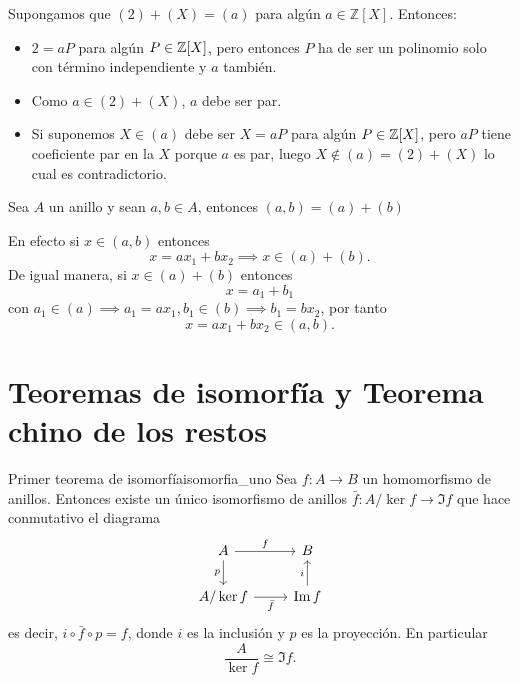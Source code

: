 \begin{proofbox}
    Supongamos que \((2) + (X) = (a)\) para algún \(a \in \mathbb{Z}[X]\). Entonces:
    \begin{itemize}
        \item \(2 = aP\) para algún \(P \in \mathbb{Z}[X]\), pero entonces $P$ ha de ser un polinomio solo con término independiente y \(a\) también.
        \item Como $a \in (2) + (X)$, $a$ debe ser par. 
        \item Si suponemos \(X \in (a)\) debe ser $X = aP$ para algún \(P \in \mathbb{Z}[X]\), pero $aP$ tiene coeficiente par en la $X$ porque $a$ es par, luego $X \notin (a) = (2) + (X)$ lo cual es contradictorio.
    \end{itemize}
\end{proofbox}

\begin{example}{}{}
    Sea $A$ un anillo y sean $a,b \in A$, entonces $(a,b) = (a) + (b)$
\end{example}

\begin{proofbox}
    En efecto si $x \in (a,b)$ entonces
    \[
    x = a x_1 + b x_2 \implies x \in (a) + (b).
    \]
    De igual manera, si $x \in (a) + (b)$ entonces
    \[
    x = a_1 + b_1 
    \]
    con $a_1 \in (a) \implies a_1 = a x_1, b_1 \in (b) \implies b_1 = b x_2$, por tanto
    \[
    x = ax_1 + bx_2 \in (a,b).
    \]
\end{proofbox}

\clearpage
\section{Teoremas de isomorfía y Teorema chino de los restos}

\begin{theorem}{Primer teorema de isomorfía}{isomorfia_uno}
Sea $f : A \to B$ un homomorfismo de anillos. Entonces existe un único isomorfismo de anillos $\bar{f} : A/\ker f \to \Im f$ que hace conmutativo el diagrama
\[
\begin{tikzcd}
A \arrow[r, "f"] \arrow[d, "p"'] & B \\
A/\ker f \arrow[r, "\bar{f}"'] & \Im f \arrow[u, "i"]
\end{tikzcd}
\]
es decir, $i \circ \bar{f} \circ p = f$, donde $i$ es la inclusión y $p$ es la proyección. En particular
\[
\frac{A}{\ker f} \cong \Im f.
\]
\end{theorem}

